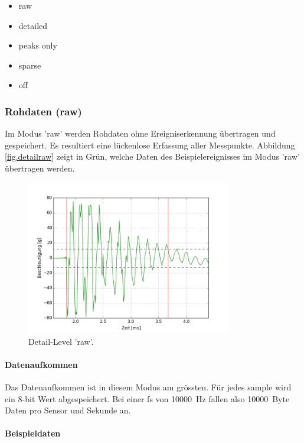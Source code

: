 \begin{itemize}
\item raw
\item detailed
\item peaks only
\item sparse
\item off
\end{itemize}


\subsubsection{Rohdaten (raw)}
Im Modus 'raw' werden Rohdaten ohne Ereigniserkennung übertragen und gespeichert. Es resultiert eine lückenlose Erfassung aller Messpunkte. Abbildung \ref{fig.detailraw} zeigt in Grün, welche Daten des Beispielereignisses im Modus 'raw' übertragen werden.


\begin{figure}
	\centering
		\includegraphics[width=0.8\textwidth]{images/rawshort.png}
	\caption{Detail-Level 'raw'.}
	\label{fig.detailRaw}
\end{figure}

\paragraph{Datenaufkommen} Das Datenaufkommen ist in diesem Modus am grössten. Für jedes \gls{sample} wird ein 8-bit Wert abgespeichert. Bei einer \gls{fs} von 10000~Hz fallen also 10000~Byte Daten pro Sensor und Sekunde an.

\paragraph{Beispieldaten} 

